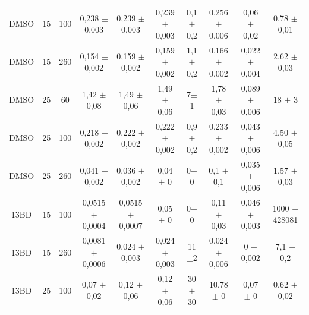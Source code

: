\begin{table}[h]
\begin{adjustbox}{angle=90}
{\begin{tabular}{c c c | c c c c c c c}
				DMSO    & 15         & 100      & 0,238   \(\pm\) 0,003  & 0,239    \(\pm\) 0,003  & 0,239     \(\pm\) 0,003   & 0,1\(\pm\)0,2 & 0,256       \(\pm\) 0,006  & 0,06        \(\pm\) 0,02     & 0,78  \(\pm\)  0,01  \\
				DMSO    & 15         & 260      & 0,154   \(\pm\) 0,002  & 0,159    \(\pm\) 0,002  & 0,159     \(\pm\) 0,002   & 1,1\(\pm\)0,2 & 0,166       \(\pm\) 0,002  & 0,022       \(\pm\) 0,004    & 2,62  \(\pm\)  0,03  \\
				DMSO    & 25         & 60       & 1,42    \(\pm\) 0,08   & 1,49     \(\pm\) 0,06   & 1,49      \(\pm\) 0,06    & 7\(\pm\)1     & 1,78        \(\pm\) 0,03   & 0,089       \(\pm\) 0,006    & 18    \(\pm\)      3  \\
				DMSO    & 25         & 100      & 0,218   \(\pm\) 0,002  & 0,222    \(\pm\) 0,002  & 0,222     \(\pm\) 0,002   & 0,9\(\pm\)0,2 & 0,233       \(\pm\) 0,002  & 0,043       \(\pm\) 0,006    & 4,50  \(\pm\)  0,05  \\
				DMSO    & 25         & 260      & 0,041   \(\pm\) 0,002  & 0,036    \(\pm\) 0,002  & 0,04      \(\pm\) 0       & 0\(\pm\)0     & 0,1         \(\pm\) 0,1    & 0,035       \(\pm\) 0,006    & 1,57  \(\pm\)  0,03  \\
				13BD    & 15         & 100      & 0,0515  \(\pm\) 0,0004 & 0,0515   \(\pm\) 0,0007 & 0,05      \(\pm\) 0       & 0\(\pm\)0     & 0,11        \(\pm\) 0,03   & 0,046       \(\pm\) 0,003    & 1000  \(\pm\)  428081  \\
				13BD    & 15         & 260      & 0,0081  \(\pm\) 0,0006 & 0,024    \(\pm\) 0,003  & 0,024     \(\pm\) 0,003   & 11\(\pm\)2    & 0,024       \(\pm\) 0,006  & 0           \(\pm\) 0,002    & 7,1   \(\pm\)   0,2  \\
				13BD    & 25         & 100      & 0,07    \(\pm\) 0,02   & 0,12     \(\pm\) 0,06   & 0,12      \(\pm\) 0,06   & 30\(\pm\)30   & 10,78       \(\pm\) 0      & 0,07        \(\pm\) 0         & 0,62  \(\pm\)  0,02  \\ \bottomrule
			\end{tabular} 
			
		}{} \end{adjustbox}
\end{table} 

